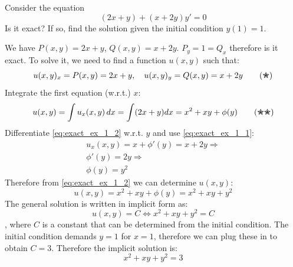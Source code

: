 \documentclass[a4paper]{article}
\begin{document}
\begin{exmp}
Consider the equation
    \[
        (2x + y) + (x + 2y)y' = 0
    \]
Is it exact? If so, find the solution given the initial condition $y(1) = 1$.
\end{exmp}
\begin{soln}
We have $P(x,y) = 2x+y$, $Q(x,y) = x + 2y$. $P_y = 1 = Q_x$ therefore is it exact.
    To solve it, we need to find a function $u(x,y)$ such that:
    \[
        u(x,y)_x = P(x,y) = 2x + y, \quad u(x,y)_y = Q(x,y) = x + 2y 
        \label{eq:exact_ex_1_1}
        \tag{\ding{78}}
    \]
    Integrate the first equation (w.r.t.) $x$:
    \[
        u(x,y) = \int u_x(x,y)\, dx = \int (2x + y) dx = x^2 + xy + \phi(y)
        \label{eq:exact_ex_1_2}
        \tag{\ding{78}\ding{78}}
    \]
    Differentiate \eqref{eq:exact_ex_1_2} w.r.t. $y$ and use \eqref{eq:exact_ex_1_1}:
    \begin{gather*}
        u_x(x,y) = x + \phi'(y) = x + 2y \Rightarrow\\
        \phi'(y) = 2y \Rightarrow \\
        \phi(y) = y^2
    \end{gather*}
    Therefore from \eqref{eq:exact_ex_1_2} we can determine $u(x,y)$: 
    \[
        u(x,y) = x^2 + xy + \phi(y) = x^2 + xy + y^2 
    \]
    The general solution is written in implicit form as:
    \[
        u(x,y) = C \Leftrightarrow x^2  +xy + y^2 = C
    \]
    , where $C$ is a constant that can be determined from the initial condition. The initial condition demands $y=1$ for $x=1$, therefore we can plug these in to obtain $C=3$. Therefore the implicit solution is:
    \[
        x^2  +xy + y^2 = 3
    \]
\end{soln}
\end{document}
